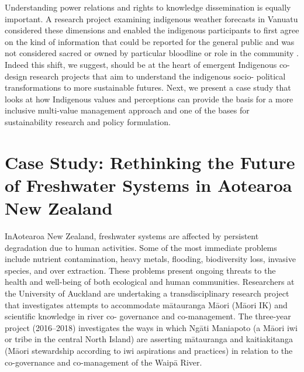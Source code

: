 \documentclass[10pt,a4paper]{article}
\begin{document}
\begin{multicols}{2}

Understanding power relations and rights to knowledge dissemination is equally important. A research project examining indigenous weather forecasts in Vanuatu considered these dimensions and enabled the indigenous participants to first agree on the kind of information that could be reported for the general public and was not considered sacred or owned by particular bloodline or role in the community \citep{r32}. Indeed this shift, we suggest, should be at the heart of emergent Indigenous co-design research projects that aim to understand the indigenous socio- political transformations to more sustainable futures. Next, we present a case study that looks at how Indigenous values and perceptions can provide the basis for a more inclusive multi-value management approach and one of the bases for sustainability research and policy formulation.

\section{Case Study: Rethinking the Future of Freshwater Systems in Aotearoa New Zealand}
\noindent InAotearoa New Zealand, freshwater systems are affected by persistent degradation due to human activities. Some of the most immediate problems include nutrient contamination, heavy metals, flooding, biodiversity loss, invasive species, and over extraction. These problems present ongoing threats to the health and well-being of both ecological and human communities. Researchers at the University of Auckland are undertaking a transdisciplinary research project that investigates attempts to accommodate m\={a}tauranga M\={a}ori (M\={a}ori IK) and scientific knowledge in river co- governance and co-management. The three-year project (2016--2018) investigates the ways in which Ng\={a}ti Maniapoto (a M\={a}ori iwi or tribe in the central North Island) are asserting m\={a}tauranga and kaitiakitanga (M\={a}ori stewardship according to iwi aspirations and practices) in relation to the co-governance and co-management of the Waip\={a} River.


\end{multicols}
\end{document}
